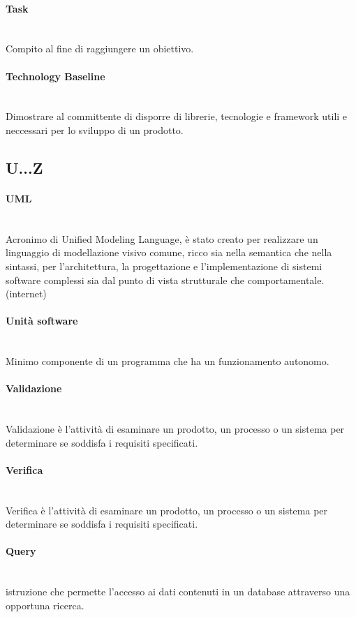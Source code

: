 \paragraph{Task}~\smallskip \\
Compito al fine di raggiungere un obiettivo.

\paragraph{Technology Baseline}~\smallskip \\
Dimostrare al committente di disporre di librerie, tecnologie e framework utili e neccessari per lo sviluppo di un prodotto.

\subsection{U...Z}

\paragraph{UML}~\smallskip \\
Acronimo di Unified Modeling Language, è stato creato per realizzare un linguaggio di modellazione visivo comune, ricco 
sia nella semantica che nella sintassi, per l'architettura, la progettazione e l'implementazione di sistemi 
software complessi sia dal punto di vista strutturale che comportamentale. (internet)

\paragraph{Unità software}~\smallskip \\
Minimo componente di un programma che ha un funzionamento autonomo.

\paragraph{Validazione}~\smallskip \\
Validazione è l'attività di esaminare un prodotto, un processo o un sistema per determinare se soddisfa i requisiti specificati.

\paragraph{Verifica}~\smallskip \\
Verifica è l'attività di esaminare un prodotto, un processo o un sistema per determinare se soddisfa i requisiti specificati.

\paragraph{Query}~\smallskip \\
istruzione che permette l'accesso ai dati contenuti in un database attraverso una opportuna ricerca.


